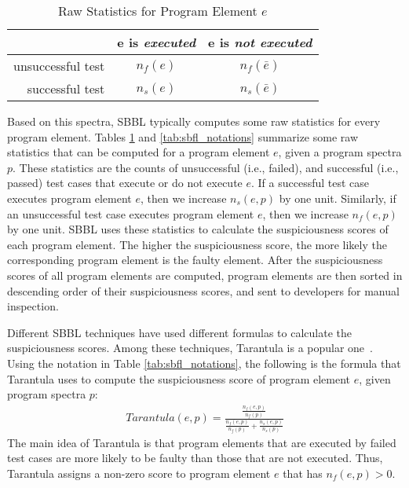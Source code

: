 \begin{table}[!t]
	\caption{Raw Statistics for Program Element $e$}
	\center
    \begin{tabular}{|r|c|c|}
    \hline
    ~                 & e is \textit{executed} & e is \textit{not executed} \\ 
    \hline
    \hline

    {unsuccessful} test & $n_f(e)$             & $n_f(\bar e)$                 \\ 
    {successful} test   & $n_s(e)$             &$n_s(\bar e)$              \\ \hline
    \end{tabular}
    \label{tab:sbfl_matrix}
\end{table}

Based on this spectra, SBBL typically computes some raw statistics for every program element. Tables \ref{tab:sbfl_matrix} and \ref{tab:sbfl_notations} summarize some raw statistics that can be computed for a program element $e$, given a program spectra $p$. These statistics are the counts of unsuccessful (i.e., failed), and successful (i.e., passed) test cases that execute or do not execute $e$. If a successful test case executes program element $e$, then we increase $n_s(e, p)$ by one unit. Similarly, if an unsuccessful test case executes program element $e$, then we increase $n_f(e, p)$ by one unit. SBBL uses these statistics to calculate the suspiciousness scores of each program element. The higher the suspiciousness score, the more likely the corresponding program element is the faulty element. After the suspiciousness scores of all program elements are computed, program elements are then sorted in descending order of their suspiciousness scores, and sent to developers for manual inspection.


Different SBBL techniques have used different formulas to calculate the suspiciousness scores. Among these techniques, Tarantula is a popular one~\cite{JH05}. Using the notation in Table \ref{tab:sbfl_notations}, the following is the formula that Tarantula uses to compute the suspiciousness score of program element $e$, given program spectra $p$:
\begin{align}
\label{eqn:tarantula}
Tarantula(e, p)=\frac{\frac{n_f(e, p)}{n_f(p)}}{\frac{n_f(e, p)}{n_f(p)}+\frac{n_s(e, p)}{n_s(p)}}	
\end{align}
The main idea of Tarantula is that program elements that are executed by failed test cases are more likely to be faulty than those that are not executed. Thus, Tarantula assigns a non-zero score to program element $e$ that has $n_f(e, p) > 0$. 

